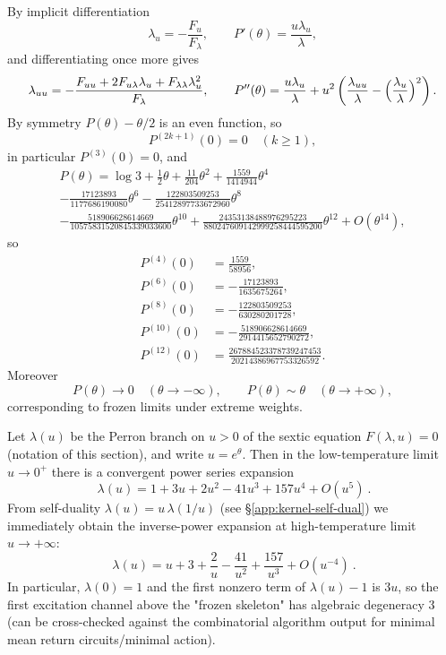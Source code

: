 By implicit differentiation
\[
\lambda_u=-\frac{F_u}{F_\lambda},\qquad
P'(\theta)=\frac{u\lambda_u}{\lambda},
\]
and differentiating once more gives
\[
\lambda_{uu}=-\frac{F_{uu}+2F_{u\lambda}\lambda_u+F_{\lambda\lambda}\lambda_u^2}{F_\lambda},
\qquad
P''(\theta)=\frac{u\lambda_u}{\lambda}+u^2\left(\frac{\lambda_{uu}}{\lambda}-\Bigl(\frac{\lambda_u}{\lambda}\Bigr)^2\right).
\]
By symmetry $P(\theta)-\theta/2$ is an even function, so
\[
P^{(2k+1)}(0)=0\quad(k\ge 1),
\]
in particular $P^{(3)}(0)=0$, and
\[
\begin{aligned}
P(\theta)=\log 3+\frac12\theta+\frac{11}{204}\theta^2+\frac{1559}{1414944}\theta^4\\
-\frac{17123893}{1177686190080}\theta^6-\frac{122803509253}{25412897733672960}\theta^8\\
-\frac{518906628614669}{10575831520845339033600}\theta^{10}
+\frac{24353138488976295223}{880247609142999258444595200}\theta^{12}
+O(\theta^{14}),
\end{aligned}
\]
so
\[
\begin{aligned}
P^{(4)}(0)&=\frac{1559}{58956},\\
P^{(6)}(0)&=-\frac{17123893}{1635675264},\\
P^{(8)}(0)&=-\frac{122803509253}{630280201728},\\
P^{(10)}(0)&=-\frac{518906628614669}{2914415652790272},\\
P^{(12)}(0)&=\frac{267884523378739247453}{20214386967753326592}.
\end{aligned}
\]
Moreover
\[
P(\theta)\to 0\quad(\theta\to-\infty),\qquad
P(\theta)\sim \theta\quad(\theta\to+\infty),
\]
corresponding to frozen limits under extreme weights.

\begin{proposition}\label{prop:lambda-extreme-asymp}
Let \(\lambda(u)\) be the Perron branch on \(u>0\) of the sextic equation \(F(\lambda,u)=0\) (notation of this section), and write \(u=e^\theta\).
Then in the low-temperature limit \(u\to 0^+\) there is a convergent power series expansion
\[
\boxed{\ \lambda(u)=1+3u+2u^2-41u^3+157u^4+O(u^5)\ }.
\]
From self-duality \(\lambda(u)=u\,\lambda(1/u)\) (see \S\ref{app:kernel-self-dual}) we immediately obtain the inverse-power expansion at high-temperature limit \(u\to+\infty\):
\[
\boxed{\ \lambda(u)=u+3+\frac{2}{u}-\frac{41}{u^2}+\frac{157}{u^3}+O(u^{-4})\ }.
\]
In particular, \(\lambda(0)=1\) and the first nonzero term of \(\lambda(u)-1\) is \(3u\), so the first excitation channel above the "frozen skeleton" has algebraic degeneracy \(3\) (can be cross-checked against the combinatorial algorithm output for minimal mean return circuits/minimal action).
\end{proposition}
